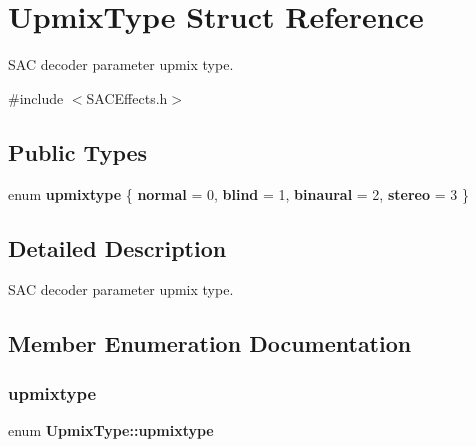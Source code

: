 \section{Upmix\+Type Struct Reference}
\label{struct_upmix_type}


S\+AC decoder parameter upmix type.  




{\ttfamily \#include $<$S\+A\+C\+Effects.\+h$>$}

\subsection*{Public Types}
\begin{DoxyCompactItemize}
\item 
enum \textbf{ upmixtype} \{ \textbf{ normal} = 0, 
\textbf{ blind} = 1, 
\textbf{ binaural} = 2, 
\textbf{ stereo} = 3
 \}
\end{DoxyCompactItemize}


\subsection{Detailed Description}
S\+AC decoder parameter upmix type. 

\subsection{Member Enumeration Documentation}
\mbox{\label{struct_upmix_type_a6e154a570349b46c268b300b13d65daf}} 
\subsubsection{upmixtype}
{\footnotesize\ttfamily enum \textbf{ Upmix\+Type\+::upmixtype}}

